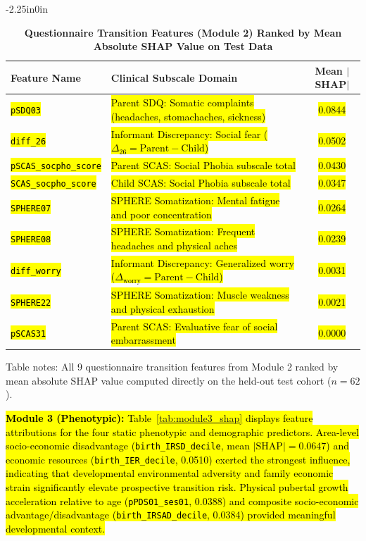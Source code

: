 \documentclass[10pt,letterpaper]{article}
\begin{document}
\begin{table}[!t]
\begin{adjustwidth}{-2.25in}{0in}
\centering
\caption{\textbf{Questionnaire Transition Features (Module 2) Ranked by Mean Absolute SHAP Value on Test Data}}
\label{tab:module2_shap}
\footnotesize
\renewcommand{\arraystretch}{1.2}
\begin{tabular}{|l|l|c|}
\hline
\textbf{Feature Name} & \textbf{Clinical Subscale Domain} & \textbf{Mean $|$SHAP$|$} \\
\hline
\hl{\texttt{pSDQ03}} & \hl{Parent SDQ: Somatic complaints (headaches, stomachaches, sickness)} & \hl{0.0844} \\
\hline
\hl{\texttt{diff\_26}} & \hl{Informant Discrepancy: Social fear ($\Delta_{26} = \text{Parent} - \text{Child}$)} & \hl{0.0502} \\
\hline
\hl{\texttt{pSCAS\_socpho\_score}} & \hl{Parent SCAS: Social Phobia subscale total} & \hl{0.0430} \\
\hline
\hl{\texttt{SCAS\_socpho\_score}} & \hl{Child SCAS: Social Phobia subscale total} & \hl{0.0347} \\
\hline
\hl{\texttt{SPHERE07}} & \hl{SPHERE Somatization: Mental fatigue and poor concentration} & \hl{0.0264} \\
\hline
\hl{\texttt{SPHERE08}} & \hl{SPHERE Somatization: Frequent headaches and physical aches} & \hl{0.0239} \\
\hline
\hl{\texttt{diff\_worry}} & \hl{Informant Discrepancy: Generalized worry ($\Delta_{\text{worry}} = \text{Parent} - \text{Child}$)} & \hl{0.0031} \\
\hline
\hl{\texttt{SPHERE22}} & \hl{SPHERE Somatization: Muscle weakness and physical exhaustion} & \hl{0.0021} \\
\hline
\hl{\texttt{pSCAS31}} & \hl{Parent SCAS: Evaluative fear of social embarrassment} & \hl{0.0000} \\
\hline
\end{tabular}
\begin{flushleft}
Table notes: All 9 questionnaire transition features from Module 2 ranked by mean absolute SHAP value computed directly on the held-out test cohort ($n=62$).
\end{flushleft}
\end{adjustwidth}
\end{table}

\hl{\textbf{Module 3 (Phenotypic):} Table~\ref{tab:module3_shap} displays feature attributions for the four static phenotypic and demographic predictors. Area-level socio-economic disadvantage (\texttt{birth\_IRSD\_decile}, mean $|\mathrm{SHAP}| = 0.0647$) and economic resources (\texttt{birth\_IER\_decile}, 0.0510) exerted the strongest influence, indicating that developmental environmental adversity and family economic strain significantly elevate prospective transition risk. Physical pubertal growth acceleration relative to age (\texttt{pPDS01\_ses01}, 0.0388) and composite socio-economic advantage/disadvantage (\texttt{birth\_IRSAD\_decile}, 0.0384) provided meaningful developmental context.}
\end{document}
